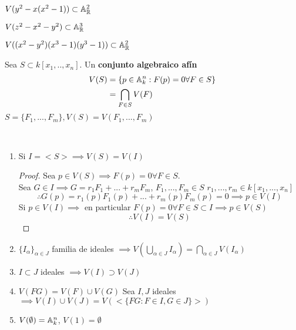 \begin{ejm}
    $V(y^2-x(x^2-1))\subset\mathbb{A}_{\mathbb{R}}^2$ %
\end{ejm}

\begin{ejm}
    $V(z^2-x^2-y^2)\subset\mathbb{A}_{\mathbb{R}}^3$ %
\end{ejm}

\begin{ejm}
    $V((x^2-y^2)(x^3-1)(y^3-1))\subset\mathbb{A}_{\mathbb{R}}^2$ %
\end{ejm}

\begin{defn}
    Sea $S\subset k[x_1,..,x_n]$. Un \textbf{conjunto algebraico afín}
    \begin{align*}
        V(S) & =\{p\in\mathbb{A}^n_k:F(p)=0\forall F\in S\} \\
             & =\bigcap_{F\in S}V(F)
    \end{align*}
    $S=\{F_1,...,F_m\}, V(S)=V(F_1,...,F_m)$
\end{defn}
\begin{ppty}
    \
    \begin{enumerate}
        \item Si $I=<S>\implies V(S)=V(I)$
              \begin{proof}
                  Sea $p\in V(S)\implies F(p)=0\forall F\in S$.\\
                  Sea $G\in I\implies G=r_1F_1+...+r_mF_m$, $F_1,...,F_m\in S$ $r_1,...,r_m\in k[x_1,...,x_n]$\\
                  \[\therefore G(p)=r_1(p)F_1(p)+...+r_m(p)F_m(p)=0\implies p\in V(I)\]
                  Si $p\in V(I)\implies$ en particular $F(p)=0\forall F\in S\subset I\implies p\in V(S)$\\
                  \[\therefore V(I)=V(S)\]
              \end{proof}
        \item $\{I_\alpha\}_{\alpha\in J}$ familia de ideales $\implies V(\bigcup_{\alpha\in J}I_\alpha)=\bigcap_{\alpha\in J}V(I_\alpha)$
        \item $I\subset J$ ideales $\implies V(I)\supset V(J)$
        \item $V(FG)=V(F)\cup V(G)$ Sea $I,J$ ideales $\implies V(I)\cup V(J)=V(<\{FG:F\in I, G\in J\}>)$
        \item $V(\emptyset)=\mathbb{A}_k^n$, $V(1)=\emptyset$
    \end{enumerate}
\end{ppty}
